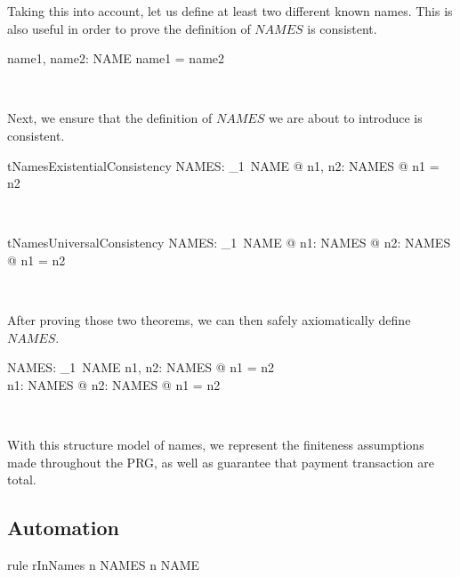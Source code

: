 Taking this into account, let us define at least two different known names.
This is also useful in order to prove the definition of $NAMES$ is consistent.
%
\begin{LNewADef}
\begin{axdef}
  name1, name2: NAME
\where
    \lnot name1 = name2
\end{axdef}~\end{LNewADef}
%
Next, we ensure that the definition of $NAMES$ we are about to introduce is
consistent.
%
\begin{LConsistency}
\begin{theorem}{tNamesExistentialConsistency}
    \exists NAMES: \finset_1~NAME @ \exists n1, n2: NAMES @ \lnot  n1 = n2
\end{theorem}~\end{LConsistency}
%
\begin{LConsistency}
\begin{theorem}{tNamesUniversalConsistency}
    \exists NAMES: \finset_1~NAME @ \forall n1: NAMES @ \exists n2: NAMES @ \lnot  n1 = n2
\end{theorem}~\end{LConsistency}
%
After proving those two theorems, we can then safely axiomatically define $NAMES$.
%
\begin{LNewADef}
\begin{axdef}
  NAMES: \finset_1~NAME
\where
   \exists n1, n2: NAMES @ \lnot  n1 = n2 \\
   \forall n1: NAMES @ \exists  n2: NAMES @ \lnot  n1 = n2
\end{axdef}~\end{LNewADef}
%
With this structure model of names, we represent the finiteness assumptions
made throughout the PRG, as well as guarantee that payment transaction are
total.

\subsection*{Automation}

\begin{LRRT}
\begin{theorem}{rule rInNames}
    n \in NAMES \implies n \in NAME
\end{theorem}~\end{LRRT}


